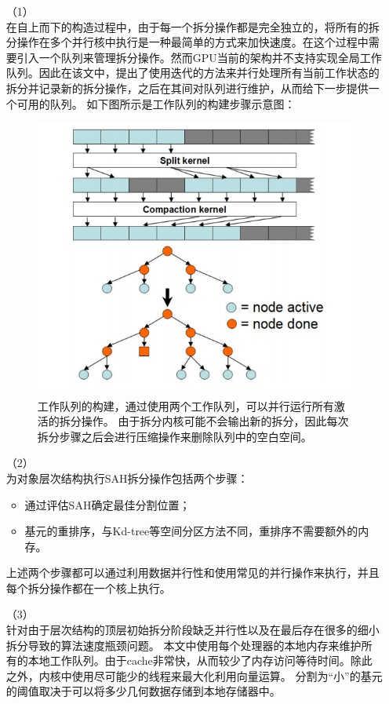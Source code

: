 \documentclass[11pt]{article}
\begin{document}
\begin{itemize}
\item[（1）]{} \mbox{}\\
在自上而下的构造过程中，由于每一个拆分操作都是完全独立的，将所有的拆分操作在多个并行核中执行是一种最简单的方式来加快速度。在这个过程中需要引入一个队列来管理拆分操作。然而GPU当前的架构并不支持实现全局工作队列。因此在该文中，提出了使用迭代的方法来并行处理所有当前工作状态的拆分并记录新的拆分操作，之后在其间对队列进行维护，从而给下一步提供一个可用的队列。	如下图所示是工作队列的构建步骤示意图：
\begin{figure}[H]
\begin{center}
\includegraphics[scale=0.7]{SAH1.png}
\caption{工作队列的构建，通过使用两个工作队列，可以并行运行所有激活的拆分操作。 由于拆分内核可能不会输出新的拆分，因此每次拆分步骤之后会进行压缩操作来删除队列中的空白空间。}
\end{center}
\end{figure}
\item[（2）]{} \mbox{}\\
为对象层次结构执行SAH拆分操作包括两个步骤：
\begin{itemize}
\item{通过评估SAH确定最佳分割位置；}
\item{基元的重排序，与Kd-tree等空间分区方法不同，重排序不需要额外的内存。}
\end{itemize}
上述两个步骤都可以通过利用数据并行性和使用常见的并行操作来执行，并且每个拆分操作都在一个核上执行。
\item[（3）]{} \mbox{}\\
针对由于层次结构的顶层初始拆分阶段缺乏并行性以及在最后存在很多的细小拆分导致的算法速度瓶颈问题。
本文中使用每个处理器的本地内存来维护所有的本地工作队列。由于cache非常快，从而较少了内存访问等待时间。除此之外，内核中使用尽可能少的线程来最大化利用向量运算。 分割为“小”的基元的阈值取决于可以将多少几何数据存储到本地存储器中。
\end{itemize}
\end{document}
